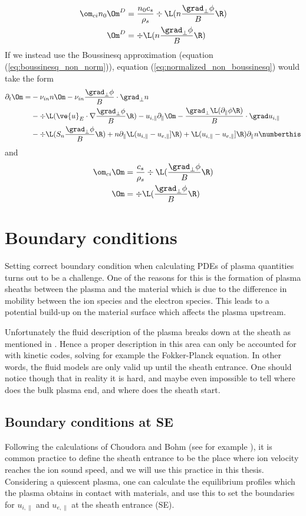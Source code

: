 \begin{align*}
    \om_{ci}n_0\Om^D &= \frac{n_0 c_s}{\rho_s}\div\L(n\frac{\grad_\perp\phi}{B}\R)\\
    \Om^D &= \div\L(n\frac{\grad_\perp\phi}{B}\R)
\end{align*}
%
If we instead use the Boussinesq approximation (equation
(\ref{eq:boussinesq_non_norm})), equation (\ref{eq:normalized_non_boussinesq})
would take the form
%
\begin{align*}
  \partial_t \Om
  =&
  - \nu_{in} n\Om - \nu_{in} \frac{\grad_\perp \phi}{B} \cdot \grad_\perp n
  \\
  &
  - \div\L(\ve{u}_E\cdot \nabla \frac{\grad_\perp \phi}{B} \R)
  - u_{i,\|}\partial_\|\Om
  - \frac{\grad_\perp\L( \partial_\|\phi\R)}{B}\cdot\grad u_{i,\|}
 \\
 &
 - \div\L(S_n \frac{ \grad_\perp \phi }{B}\R)
 + n \partial_\| \L(u_{i,\|} - u_{e,\|}]\R)
 + \L(u_{i,\|} - u_{e,\|}]\R) \partial_\| n
  \numberthis
  \label{eq:normalized_boussinesq}
\end{align*}
%
and
%
\begin{align*}
    \om_{ci}\Om &= \frac{ c_s}{\rho_s}\div\L(\frac{\grad_\perp\phi}{B}\R)\\
    \Om &= \div\L(\frac{\grad_\perp\phi}{B}\R)
\end{align*}
%

\section{Boundary conditions}
%
Setting correct boundary condition when calculating PDEs of plasma quantities
turns out to be a challenge. One of the reasons for this is the formation of
plasma sheaths between the plasma and the material which is due to the
difference in mobility between the ion species and the electron species. This
leads to a potential build-up on the material surface which affects the plasma
upstream.

Unfortunately the fluid description of the plasma breaks down at the sheath as
mentioned in \cite{Loizu2012a}. Hence a proper description in this area can
only be accounted for with kinetic codes, solving for example the Fokker-Planck
equation. In other words, the fluid models are only valid up until the sheath
entrance. One should notice though that in reality it is hard, and maybe even
impossible to tell where does the bulk plasma end, and where does the sheath
start.

%
\subsection{Boundary conditions at SE}
Following the calculations of Choudora and Bohm (see for example
\cite{Stangeby2000book}), it is common practice to define the sheath entrance
to be the place where ion velocity reaches the ion sound speed, and we will use
this practice in this thesis. Considering a quiescent plasma, one can calculate
the equilibrium profiles which the plasma obtains in contact with materials,
and use this to set the boundaries for $u_{i, \|}$ and $u_{e, \|}$ at the
sheath entrance (SE).

